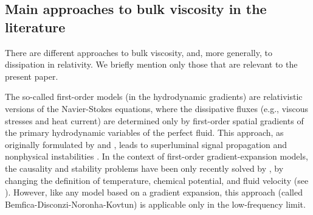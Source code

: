 \documentclass[aps,prd,twocolumn,a4paper,floatfix,nofootbib,superscriptaddress,nofootinbib]{revtex4}
\begin{document}
\subsection{Main approaches to bulk viscosity in the literature}

There are different approaches to bulk viscosity, and, more generally, to dissipation in relativity. 
We briefly mention only those that are relevant to the present paper.

The so-called first-order models (in the hydrodynamic gradients) are
relativistic versions of the Navier-Stokes equations, where the dissipative
fluxes (e.g., viscous stresses and heat current) are determined only by
first-order spatial gradients of the primary hydrodynamic variables of the
perfect fluid.  This approach, as originally formulated by \citet{Eckart40} and
\citet{landau6}, leads to superluminal signal propagation and nonphysical
instabilities \citep{Hiscock_Insatibility_first_order}.  In the context of
first-order gradient-expansion models, the causality and stability problems
have been only recently solved by \citet{Bemfica22}, by changing the definition
of temperature, chemical potential, and fluid velocity (see \citet{Kovtun19}).
However, like any model based on a gradient expansion, this approach (called
Bemfica-Disconzi-Noronha-Kovtun) is applicable only in the low-frequency limit.
\end{document}
